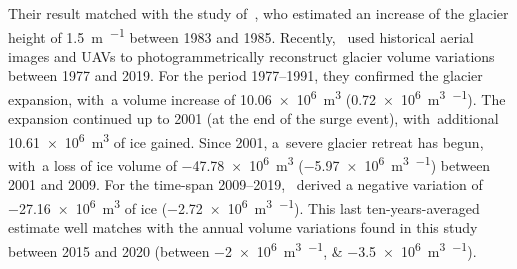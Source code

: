 Their result matched with the study of~\cite{Roethlisberger1985}, who estimated an
increase of the glacier height of \SI[retain-explicit-plus]{+1.5}{\m\per\year} between
1983 and 1985.
Recently,~\cite{Degaetani2021} used historical aerial images and UAVs to
photogrammetrically reconstruct glacier volume variations between 1977 and 2019.
For the period 1977--1991, they confirmed the glacier expansion, with~a volume
increase of \SI[retain-explicit-plus]{+10.06e6}{\cubic\meter}
(\SI[retain-explicit-plus]{+0.72e6}{\cubic\m\per\year}).
The expansion continued up to 2001 (at the end of the surge event), with~additional
\SI{10.61e6}{\cubic\m} of ice gained.
Since 2001, a~severe glacier retreat has begun, with~a loss of ice volume of
\SI{-47.78e6}{\cubic\meter} (\SI{-5.97e6}{\cubic\meter\per\year}) between 2001 and 2009.
For the time-span 2009--2019,~\citep{Degaetani2021} derived a negative variation of
\SI{-27.16e6}{\cubic\m} of ice (\SI{-2.72e6}{\cubic\meter\per\year}).
This last ten-years-averaged estimate well matches with the annual volume variations
found in this study between 2015 and 2020 (between
\SIlist{-2e6;-3.5e6}{\cubic\meter\per\year}).



\makechapterbibliography{}

